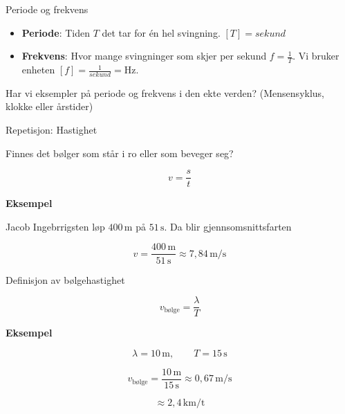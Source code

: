 \documentclass[aspectratio=119,12pt]{beamer}
\begin{document}
\begin{frame}{Periode og frekvens}

    \begin{itemize}
        \item \textbf{Periode}: Tiden $T$  det tar for én hel svingning. $[T] = sekund$ 
            \item \textbf{Frekvens}: Hvor mange svingninger som skjer per sekund $f = \frac{1}{T}$. Vi bruker enheten $[f]= \frac{1}{sekund}=\mathrm{Hz}$.
    \end{itemize}
\vspace{0.5cm}


Har vi eksempler på periode og frekvens i den ekte verden? (Mensensyklus, klokke eller årstider)


\end{frame}




\begin{frame}{Repetisjon: Hastighet}


Finnes det bølger som står i ro eller som beveger seg?  

\begin{center}
\Large

\[
\boxed{v=\frac{s}{t}}
\]

\end{center}

\vspace{0.7cm}

\textbf{Eksempel}

Jacob Ingebrrigsten løp \(400\,\mathrm{m}\) på \(51\,\mathrm{s}\). Da blir gjennsomsnittsfarten

\[
v
=
\frac{400\,\mathrm{m}}{51\,\mathrm{s}}
\approx
7{,}84\,\mathrm{m/s}
\]

\end{frame}



\begin{frame}{Definisjon av bølgehastighet}

\begin{center}

\Large
\[
\boxed{
v_{\text{bølge}}
=
\frac{\lambda}{T}
}
\]

\end{center}

\vspace{0.7cm}

\textbf{Eksempel}

\[
\lambda=10\,\mathrm{m},
\qquad
T=15\,\mathrm{s}
\]

\[
v_{\text{bølge}}
=
\frac{10\,\mathrm{m}}{15\,\mathrm{s}}
\approx
0{,}67\,\mathrm{m/s}
\]

\[
\approx 2{,}4\,\mathrm{km/t}
\]

\end{frame}
\end{document}
